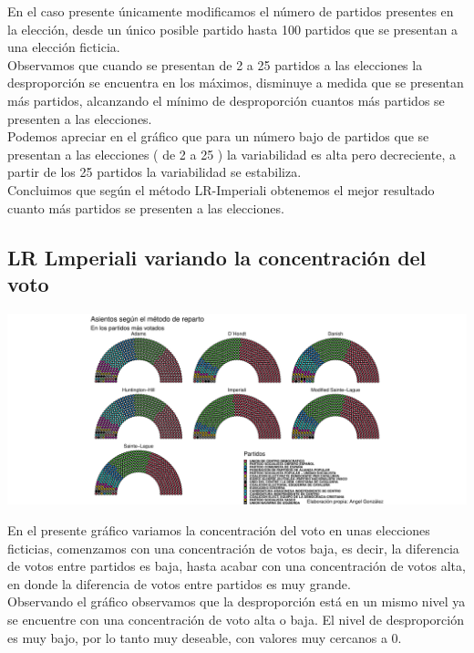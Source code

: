\documentclass[12pt,a4paper,]{book}
\numberwithin{dummy}{section}
\theoremstyle{ocrenumbox}
\theoremstyle{blacknumex}
\theoremstyle{blacknumbox}
\theoremstyle{ocrenum}
\theoremstyle{ocrenum}
\begin{document}
En el caso presente únicamente modificamos el número de partidos
presentes en la elección, desde un único posible partido hasta 100
partidos que se presentan a una elección ficticia.\\
Observamos que cuando se presentan de 2 a 25 partidos a las elecciones
la desproporción se encuentra en los máximos, disminuye a medida que se
presentan más partidos, alcanzando el mínimo de desproporción cuantos
más partidos se presenten a las elecciones.\\
Podemos apreciar en el gráfico que para un número bajo de partidos que
se presentan a las elecciones ( de 2 a 25 ) la variabilidad es alta pero
decreciente, a partir de los 25 partidos la variabilidad se
estabiliza.\\
Concluimos que según el método LR-Imperiali obtenemos el mejor resultado
cuanto más partidos se presenten a las elecciones.

\hypertarget{lr-lmperiali-variando-la-concentraciuxf3n-del-voto}{%
\subsection{LR Lmperiali variando la concentración del
voto}\label{lr-lmperiali-variando-la-concentraciuxf3n-del-voto}}

\begin{center}\includegraphics[width=0.95\linewidth]{figurasR/unnamed-chunk-60-1} \end{center}

En el presente gráfico variamos la concentración del voto en unas
elecciones ficticias, comenzamos con una concentración de votos baja, es
decir, la diferencia de votos entre partidos es baja, hasta acabar con
una concentración de votos alta, en donde la diferencia de votos entre
partidos es muy grande.\\
Observando el gráfico observamos que la desproporción está en un mismo
nivel ya se encuentre con una concentración de voto alta o baja. El
nivel de desproporción es muy bajo, por lo tanto muy deseable, con
valores muy cercanos a 0.
\end{document}
